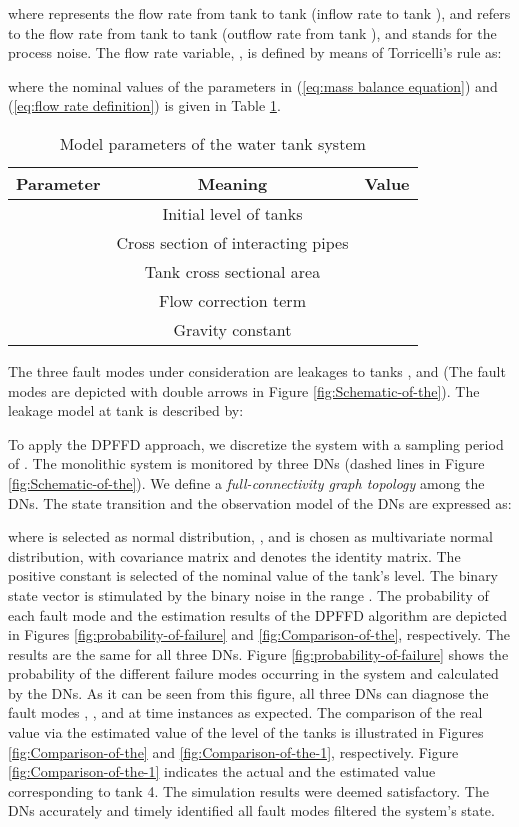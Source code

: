 \documentclass[10pt,twocolumn,twoside]{IEEEtran}
\begin{document}
where  represents the flow rate from tank  to tank 
(inflow rate to tank ), and  refers to the flow rate
from tank  to tank  (outflow rate from tank ), and 
stands for the process noise. The flow rate variable, ,
is defined by means of Torricelli's rule as: 

where the nominal values of the parameters in (\ref{eq:mass balance equation})
and (\ref{eq:flow rate definition}) is given in Table \ref{tab:Model-parameters-of-1}. 

\begin{table}
\caption{Model parameters of the water tank system \label{tab:Model-parameters-of-1}}


\centering{}\begin{tabular}{|c|c|c|}
\hline 
Parameter & Meaning & Value\tabularnewline
\hline 
 & Initial level of tanks & \tabularnewline
 & Cross section of interacting pipes & \tabularnewline
 & Tank cross sectional area & \tabularnewline
 & Flow correction term  & \tabularnewline
 & Gravity constant & \tabularnewline
\hline 
\end{tabular}
\end{table}
The three fault modes under consideration are leakages to tanks ,
 and  (The fault modes are depicted with double arrows in
Figure \ref{fig:Schematic-of-the}). The leakage model at tank 
is described by: 

To apply the DPFFD approach, we discretize the system with a sampling
period of . The monolithic system is monitored by
three DNs (dashed lines in Figure \ref{fig:Schematic-of-the}). We
define a \textit{\small{}full-connectivity graph topology} among the
DNs. The state transition and the observation model of the DNs
are expressed as:

where  is selected as normal distribution, ,
and  is chosen as multivariate normal
distribution,  with covariance
matrix  and 
denotes the identity matrix. The positive constant  is selected
 of the nominal value of the tank\textquoteright{}s level. The binary state vector  is stimulated by the binary noise in the range . The probability of each fault mode and the estimation results of the
DPFFD algorithm are depicted in Figures \ref{fig:probability-of-failure}
and \ref{fig:Comparison-of-the}, respectively. The results are the
same for all three DNs. Figure \ref{fig:probability-of-failure} shows
the probability of the different failure modes occurring  in the system
and calculated by the DNs. As it can be seen from this figure, all
three DNs can diagnose the fault modes , , and  at time
instances  as expected. The comparison of
the real value via the estimated value of the level of the tanks is
illustrated in Figures \ref{fig:Comparison-of-the} and \ref{fig:Comparison-of-the-1}, respectively. Figure \ref{fig:Comparison-of-the-1} indicates the actual and the estimated value corresponding to tank 4. The simulation
results were deemed satisfactory. The DNs accurately and timely identified
all fault modes filtered the system's state. 
\end{document}
